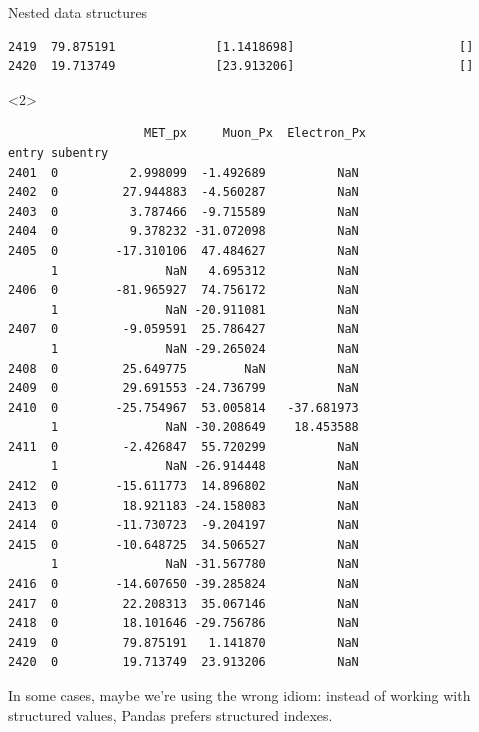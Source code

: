 \documentclass[aspectratio=169]{beamer}
\begin{document}
\begin{frame}[fragile]{Nested data structures}
\begin{onlyenv}
\begin{verbatim}
2419  79.875191              [1.1418698]                       []
2420  19.713749              [23.913206]                       []
\end{verbatim}
\vspace{1.7 cm}
\end{onlyenv}\begin{onlyenv}<2>\begin{verbatim}
                   MET_px     Muon_Px  Electron_Px
entry subentry
2401  0          2.998099  -1.492689          NaN
2402  0         27.944883  -4.560287          NaN
2403  0          3.787466  -9.715589          NaN
2404  0          9.378232 -31.072098          NaN
2405  0        -17.310106  47.484627          NaN
      1               NaN   4.695312          NaN
2406  0        -81.965927  74.756172          NaN
      1               NaN -20.911081          NaN
2407  0         -9.059591  25.786427          NaN
      1               NaN -29.265024          NaN
2408  0         25.649775        NaN          NaN
2409  0         29.691553 -24.736799          NaN
2410  0        -25.754967  53.005814   -37.681973
      1               NaN -30.208649    18.453588
2411  0         -2.426847  55.720299          NaN
      1               NaN -26.914448          NaN
2412  0        -15.611773  14.896802          NaN
2413  0         18.921183 -24.158083          NaN
2414  0        -11.730723  -9.204197          NaN
2415  0        -10.648725  34.506527          NaN
      1               NaN -31.567780          NaN
2416  0        -14.607650 -39.285824          NaN
2417  0         22.208313  35.067146          NaN
2418  0         18.101646 -29.756786          NaN
2419  0         79.875191   1.141870          NaN
2420  0         19.713749  23.913206          NaN
\end{verbatim}
\end{onlyenv}

\vspace{-5 cm}
\hfill \begin{minipage}{0.33\linewidth}
\large
In some cases, maybe we're using the wrong idiom: instead of working with structured values, Pandas prefers structured indexes.
\end{minipage}
\vspace{5 cm}
\end{frame}
\end{document}
